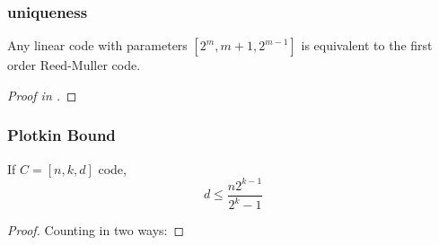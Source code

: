 \message{ !name(1.tex)}\documentclass[xcolor=xvgnames]{beamer}
\newcommand{\rem}{Reed-Muller}
\begin{document}


\begin{frame}
 \frametitle{uniqueness}
\begin{theorem}
   Any linear code with parameters $[2^m, m+1, 2^{m-1}]$ is equivalent to the first order \rem{} code.
\begin{proof}
[Proof in \cite{uniq}]
\end{proof} \label{uniqness}
\end{theorem}
\end{frame}



\begin{frame}
 \frametitle{Plotkin Bound}

\begin{theorem}
    If $C = [n,k,d]$ code, \begin{equation*}
d \leq \frac{n2^{k-1}}{2^k - 1}
\end{equation*}
  \begin{proof}
Counting in two ways:
\end{proof}
\end{theorem}


\end{frame}

\end{document}
